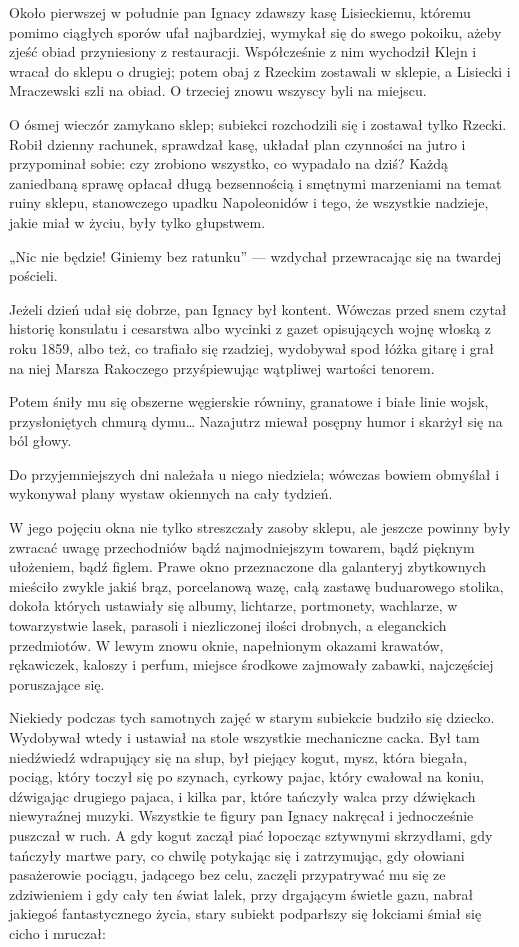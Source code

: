 \documentclass{book}
\begin{document}
Około pierwszej w południe pan Ignacy zdawszy kasę Lisieckiemu, któremu pomimo ciągłych sporów ufał najbardziej, wymykał się do swego pokoiku, ażeby zjeść obiad przyniesiony z restauracji. Współcześnie z nim wychodził Klejn i wracał do sklepu o drugiej; potem obaj z Rzeckim zostawali w sklepie, a Lisiecki i Mraczewski szli na obiad. O trzeciej znowu wszyscy byli na miejscu.

O ósmej wieczór zamykano sklep; subiekci rozchodzili się i zostawał tylko Rzecki. Robił dzienny rachunek, sprawdzał kasę, układał plan czynności na jutro i przypominał sobie: czy zrobiono wszystko, co wypadało na dziś? Każdą zaniedbaną sprawę opłacał długą bezsennością i smętnymi marzeniami na temat ruiny sklepu, stanowczego upadku Napoleonidów i tego, że wszystkie nadzieje, jakie miał w życiu, były tylko głupstwem.

„Nic nie będzie! Giniemy bez ratunku” — wzdychał przewracając się na twardej pościeli.

Jeżeli dzień udał się dobrze, pan Ignacy był kontent. Wówczas przed snem czytał historię konsulatu i cesarstwa albo wycinki z gazet opisujących wojnę włoską z roku 1859, albo też, co trafiało się rzadziej, wydobywał spod łóżka gitarę i grał na niej Marsza Rakoczego przyśpiewując wątpliwej wartości tenorem.

Potem śniły mu się obszerne węgierskie równiny, granatowe i białe linie wojsk, przysłoniętych chmurą dymu… Nazajutrz miewał posępny humor i skarżył się na ból głowy.

Do przyjemniejszych dni należała u niego niedziela; wówczas bowiem obmyślał i wykonywał plany wystaw okiennych na cały tydzień.

W jego pojęciu okna nie tylko streszczały zasoby sklepu, ale jeszcze powinny były zwracać uwagę przechodniów bądź najmodniejszym towarem, bądź pięknym ułożeniem, bądź figlem. Prawe okno przeznaczone dla galanteryj zbytkownych mieściło zwykle jakiś brąz, porcelanową wazę, całą zastawę buduarowego stolika, dokoła których ustawiały się albumy, lichtarze, portmonety, wachlarze, w towarzystwie lasek, parasoli i niezliczonej ilości drobnych, a eleganckich przedmiotów. W lewym znowu oknie, napełnionym okazami krawatów, rękawiczek, kaloszy i perfum, miejsce środkowe zajmowały zabawki, najczęściej poruszające się.

Niekiedy podczas tych samotnych zajęć w starym subiekcie budziło się dziecko. Wydobywał wtedy i ustawiał na stole wszystkie mechaniczne cacka. Był tam niedźwiedź wdrapujący się na słup, był piejący kogut, mysz, która biegała, pociąg, który toczył się po szynach, cyrkowy pajac, który cwałował na koniu, dźwigając drugiego pajaca, i kilka par, które tańczyły walca przy dźwiękach niewyraźnej muzyki. Wszystkie te figury pan Ignacy nakręcał i jednocześnie puszczał w ruch. A gdy kogut zaczął piać łopocząc sztywnymi skrzydłami, gdy tańczyły martwe pary, co chwilę potykając się i zatrzymując, gdy ołowiani pasażerowie pociągu, jadącego bez celu, zaczęli przypatrywać mu się ze zdziwieniem i gdy cały ten świat lalek, przy drgającym świetle gazu, nabrał jakiegoś fantastycznego życia, stary subiekt podparłszy się łokciami śmiał się cicho i mruczał:
\end{document}

